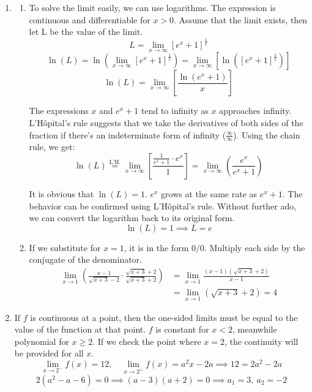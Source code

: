 \documentclass[a4paper, 12pt]{article}
\begin{document}

\begin{enumerate}[leftmargin=*,label=\textbf{\arabic*.}]
\item \begin{enumerate}[leftmargin=*,label=\textbf{\alph*.}]
\item To solve the limit easily, we can use logarithms. The expression is continuous and differentiable for $x > 0$. Assume that the limit exists, then let L be the value of the limit.
\[ L = \lim_{x \to \infty} [ e^x + 1]^{\frac{1}{x}} \]
\[
\ln(L) = \ln\left(\lim_{x \to \infty} [ e^x + 1]^{\frac{1}{x}}\right) = \lim_{x \to \infty} \left[ \ln\left( [ e^x + 1]^{\frac{1}{x}} \right) \right]
\]
\[\ln(L) = \lim_{x \to \infty} \left[ \frac{\ln( e^x + 1)}{x}\right]\]

The expressions $x$ and $ e^x + 1$ tend to infinity as $x$ approaches infinity. L'Hôpital's rule suggests that we take the derivatives of both sides of the fraction if there's an indeterminate form of infinity ($\frac{\infty}{\infty}$). Using the chain rule, we get:
\[\ln(L) \overset{\text{L'H.}}{=} \lim_{x \to \infty} \left[ \frac{\frac{1}{ e^x+1} \cdot  e^x}{1}\right] = \lim_{x \to \infty} \left( \frac{ e^x}{ e^x+1} \right)\]

It is obvious that $\ln(L) = 1$. $ e^x$ grows at the same rate as $ e^x + 1$. The behavior can be confirmed using L'Hôpital's rule. Without further ado, we can convert the logarithm back to its original form.
\[\ln(L) = 1\implies\boxed{L=e}\]

\item If we substitute for $x = 1$, it is in the form $0/0$. Multiply each side by the conjugate of the denominator.
\begin{align*}
\lim_{x \to 1}\left(\frac{x-1}{\sqrt{x+3}-2}\cdot\frac{\sqrt{x+3}+2}{\sqrt{x+3}+2}\right)
&=\lim_{x\to1}\frac{(x-1)(\sqrt{x+3}+2)}{x-1}\\
&=\lim_{x\to1}(\sqrt{x+3}+2)=\boxed{4}
\end{align*}
\end{enumerate}

\item If $f$ is continuous at a point, then the one-sided limits must be equal to the value of the function at that point. $f$ is constant for $x < 2$, meanwhile polynomial for $x \geq 2$. If we check the point where $x=2$, the continuity will be provided for all $x$.
\[\lim_{x\to2^-}f(x)=12,\quad\lim_{x\to2^+}f(x)=a^2x-2a\implies12=2a^2-2a\]
\[2(a^2-a-6)=0\implies(a-3)(a+2)=0\implies\boxed{a_1=3,\:a_2=-2}\]


\end{enumerate}
\end{document}
